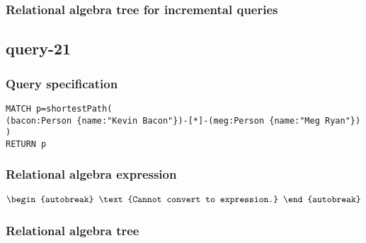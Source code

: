 \subsubsection*{Relational algebra tree for incremental queries}

\subsection{query-21}

\subsubsection*{Query specification}

\begin{lstlisting}
MATCH p=shortestPath(
(bacon:Person {name:"Kevin Bacon"})-[*]-(meg:Person {name:"Meg Ryan"})
)
RETURN p
\end{lstlisting}

\subsubsection*{Relational algebra expression}

\begin{align*}
\begin{autobreak}
\text{Cannot convert to expression.}
\end{autobreak}
\end{align*}

\subsubsection*{Relational algebra tree}

